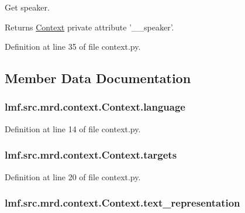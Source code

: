 Get speaker. 

\begin{DoxyReturn}{Returns}
\hyperlink{classlmf_1_1src_1_1mrd_1_1context_1_1_context}{Context} private attribute '\+\_\+\+\_\+speaker'. 
\end{DoxyReturn}


Definition at line 35 of file context.\+py.



\subsection{Member Data Documentation}
\hypertarget{classlmf_1_1src_1_1mrd_1_1context_1_1_context_a4bbfb55e0df3e37ee91abbfc59fa4111}{
\subsubsection[{language}]{\setlength{\rightskip}{0pt plus 5cm}lmf.\+src.\+mrd.\+context.\+Context.\+language}}\label{classlmf_1_1src_1_1mrd_1_1context_1_1_context_a4bbfb55e0df3e37ee91abbfc59fa4111}


Definition at line 14 of file context.\+py.

\hypertarget{classlmf_1_1src_1_1mrd_1_1context_1_1_context_a29412f9361cee534cfa7148320e0826f}{
\subsubsection[{targets}]{\setlength{\rightskip}{0pt plus 5cm}lmf.\+src.\+mrd.\+context.\+Context.\+targets}}\label{classlmf_1_1src_1_1mrd_1_1context_1_1_context_a29412f9361cee534cfa7148320e0826f}


Definition at line 20 of file context.\+py.

\hypertarget{classlmf_1_1src_1_1mrd_1_1context_1_1_context_a471cd19ef138a424df53621024979ba7}{
\subsubsection[{text\+\_\+representation}]{\setlength{\rightskip}{0pt plus 5cm}lmf.\+src.\+mrd.\+context.\+Context.\+text\+\_\+representation}}\label{classlmf_1_1src_1_1mrd_1_1context_1_1_context_a471cd19ef138a424df53621024979ba7}


